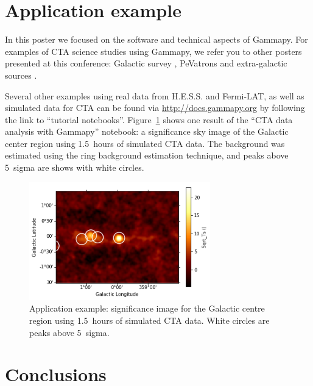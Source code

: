 \documentclass{PoS}
\newcommand{\url}[1]{\href{#1}{#1}}
\begin{document}
\section{Application example}
\label{sec:application}

In this poster we focused on the software and technical aspects of Gammapy. For
examples of CTA science studies using Gammapy, we refer you to other posters presented at this conference: Galactic survey \cite{roberta}, PeVatrons \cite{cyril} and extra-galactic sources \cite{julien}.

Several other examples using real data from H.E.S.S. and Fermi-LAT, as well as
simulated data for CTA can be found via \url{http://docs.gammapy.org} by
following the link to ``tutorial notebooks''. Figure~\ref{fig:app} shows one
result of the ``CTA data analysis with Gammapy'' notebook: a significance sky
image of the Galactic center region using 1.5~hours of simulated CTA data. The
background was estimated using the ring background estimation technique, and
peaks above 5~sigma are shows with white circles.


\begin{figure}[t]
\centering
\includegraphics[width=0.7\textwidth]{figures/gammapy_example_sky_image.png}
\caption{
Application example: significance image for the Galactic centre region using 1.5~hours of simulated CTA data.  White circles are peaks above 5~sigma.
}
\label{fig:app}
\end{figure}





\section{Conclusions}
\label{sec:conclusions}
\end{document}

